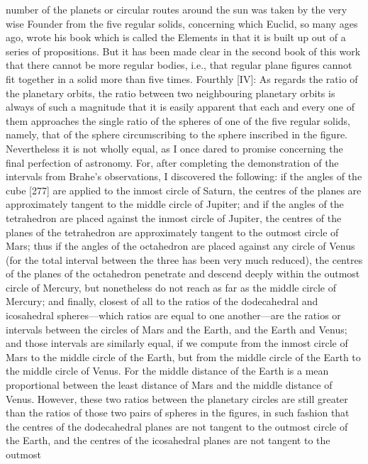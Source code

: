 \documentclass{article}
\begin{document}
number of the planets or circular routes around the sun was taken by the
very wise Founder from the five regular solids, concerning which Euclid,
so many ages ago, wrote his book which is called the Elements in that it
is built up out of a series of propositions. But it has been made clear in
the second book of this work that there cannot be more regular
bodies, i.e., that regular plane figures cannot fit together in a solid more
than five times.
Fourthly [IV]: As regards the ratio of the planetary orbits, the ratio
between two neighbouring planetary orbits is always of such a
magnitude that it is easily apparent that each and every one of them
approaches the single ratio of the spheres of one of the five regular
solids, namely, that of the sphere circumscribing to the sphere inscribed
in the figure. Nevertheless it is not wholly equal, as I once dared to
promise concerning the final perfection of astronomy. For, after
completing the demonstration of the intervals from Brahe's
observations, I discovered the following: if the angles of the cube [277]
are applied to the inmost circle of Saturn, the centres of the planes are
approximately tangent to the middle circle of Jupiter; and if the angles of
the tetrahedron are placed against the inmost circle of Jupiter, the
centres of the planes of the tetrahedron are approximately tangent to the
outmost circle of Mars; thus if the angles of the octahedron are placed
against any circle of Venus (for the total interval between the three has
been very much reduced), the centres of the planes of the octahedron
penetrate and descend deeply within the outmost circle of Mercury, but
nonetheless do not reach as far as the middle circle of Mercury; and
finally, closest of all to the ratios of the dodecahedral and icosahedral
spheres—which ratios are equal to one another—are the ratios or
intervals between the circles of Mars and the Earth, and the Earth and
Venus; and those intervals are similarly equal, if we compute from the
inmost circle of Mars to the middle circle of the Earth, but from the
middle circle of the Earth to the middle circle of Venus. For the middle
distance of the Earth is a mean proportional between the least distance
of Mars and the middle distance of Venus. However, these two ratios
between the planetary circles are still greater than the ratios of those two
pairs of spheres in the figures, in such fashion that the centres of the
dodecahedral planes are not tangent to the outmost circle of the Earth,
and the centres of the icosahedral planes are not tangent to the outmost
\end{document}
